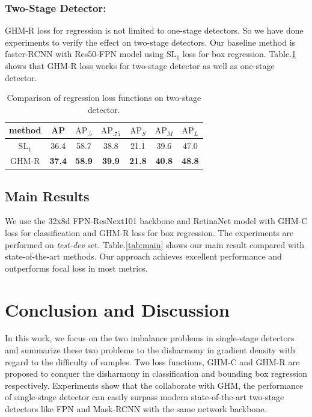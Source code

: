 \documentclass[letterpaper]{article} %
\begin{document}
\subsubsection{Two-Stage Detector:}  GHM-R loss for regression is not limited to one-stage detectors. So we have done experiments to verify the effect on two-stage detectors. Our baseline method is faster-RCNN with Res50-FPN model using $\text{SL}_1$ loss for box regression. Table.\ref{tab:reg2} shows that  GHM-R loss works for two-stage detector as well as one-stage detector.
\begin{table}[!ht]
\begin{center}
\begin{tabular}{| c | c  c  c  c  c  c |}
\hline
method & AP & $\text{AP}_{.5}$ & $\text{AP}_{.75}$ & $\text{AP}_{S}$ & $\text{AP}_{M}$ & $\text{AP}_{L}$ \\
\hline
$\text{SL}_1$ & 36.4 & 58.7 & 38.8 & 21.1 & 39.6 & 47.0 \\
GHM-R & \textbf{37.4} & \textbf{58.9} & \textbf{39.9} & \textbf{21.8} & \textbf{40.8} & \textbf{48.8} \\
\hline
\end{tabular}
\caption{Comparison of regression loss functions on two-stage detector.}
\label{tab:reg2}
\end{center}
\end{table}


\subsection{Main Results}
We use the 32x8d FPN-ResNext101 backbone and RetinaNet model with  GHM-C loss for classification and GHM-R loss for box regression. The experiments are performed on \textit{test-dev} set. Table.\ref{tab:main} shows our main result compared with state-of-the-art methods. Our approach achieves excellent performance and outperforms focal loss in most metrics.



\section{Conclusion and Discussion}
In this work, we focus on the two imbalance problems in single-stage detectors and summarize these two problems to the disharmony in gradient density with regard to the difficulty of samples. Two loss functions, GHM-C and GHM-R are proposed to conquer the disharmony in classification and bounding box regression respectively. Experiments show that the collaborate with GHM, the performance of single-stage detector can easily surpass modern state-of-the-art two-stage detectors like FPN and Mask-RCNN with the same network backbone.
\end{document}
